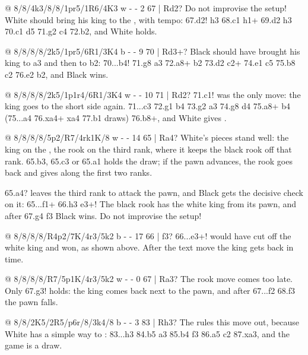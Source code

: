 
@ 8/8/4k3/8/8/1pr5/1R6/4K3 w - - 2 67 | Rd2?
Do not improvise the setup! White should bring
his king to the , with tempo: 67.\K d2! \R h3 68.\K c1 \R h1+ 69.\K d2 \R h3
70.\K c1 \K d5 71.\R g2 \K c4 72.\K b2, and White holds.

@ 8/8/8/8/2k5/1pr5/6R1/3K4 b - - 9 70 | Rd3+?
Black should have brought his king to a3 and then to b2: 70...\K b4! 71.\R g8 \K a3 72.\R a8+
\K b2 73.\K d2 \R c2+ 74.\K e1 \R c5 75.\R b8 \K c2 76.\K e2 b2, and Black wins.

@ 8/8/8/8/2k5/1p1r4/6R1/3K4 w - - 10 71 | Rd2?
71.\K c1! was the only move: the king goes to the short side again. 71...\K c3 72.\R g1 \K b4
73.\R g2 \K a3 74.\R g8 \R d4 75.\R a8+ \K b4 (75...\R a4 76.\R xa4+ \K xa4 77.\K b1 draws)
76.\R b8+, and White gives .

@ 8/8/8/8/5p2/R7/4rk1K/8 w - - 14 65 | Ra4?
White's pieces stand well: the king on the , the rook on the third rank, where it
keeps the black rook off that rank. 65.\R b3, 65.\R c3 or 65.\R a1 holds the draw; if the pawn
advances, the rook goes back and gives  along the first two ranks.

65.\R a4? leaves the third rank to attack the pawn, and Black gets the decisive check on it:
65...\K f1+ 66.\K h3 \R e3+! The black rook has  the white king from its pawn, and
after 67.\K g4 f3 Black wins. Do not improvise the
setup!

@ 8/8/8/8/R4p2/7K/4r3/5k2 b - - 17 66 | f3?
66...\R e3+! would have cut off the white king and won, as shown above. After the text move the
king gets back in time.

@ 8/8/8/8/R7/5p1K/4r3/5k2 w - - 0 67 | Ra3?
The rook move comes too late. Only 67.\K g3! holds: the king comes back next to the pawn, and after
67...f2 68.\K f3 the pawn falls.

@ 8/8/2K5/2R5/p6r/8/3k4/8 b - - 3 83 | Rh3?
The  rules this move out,
because White has a simple way to :
83...\R h3 84.\K b5 a3 85.\K b4 \R f3 86.\R a5 \K c2 87.\R xa3, and the game is a draw.


